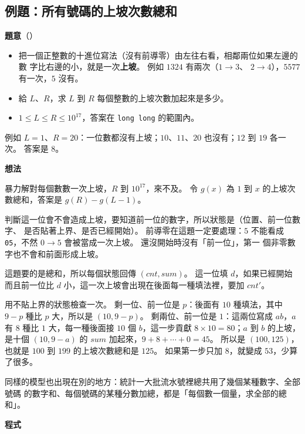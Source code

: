 \subsection{例題：所有號碼的上坡次數總和}
\label{sec:dg-ex-ascent}

\textbf{題意}（）

\begin{itemize}
\item 把一個正整數的十進位寫法（沒有前導零）由左往右看，相鄰兩位如果左邊的數
字比右邊的小，就是一次\textbf{上坡}。 例如 $1324$ 有兩次（$1 \to 3$、
$2 \to 4$），$5577$ 有一次，$5$ 沒有。
\item 給 $L$、$R$，求 $L$ 到 $R$ 每個整數的上坡次數加起來是多少。
\item $1 \le L \le R \le 10^{17}$，答案在 \texttt{long long} 的範圍內。
\end{itemize}

例如 $L = 1$、$R = 20$：一位數都沒有上坡；$10$、$11$、$20$ 也沒有；$12$ 到
$19$ 各一次。 答案是 $8$。

\textbf{想法}

暴力解對每個數數一次上坡，$R$ 到 $10^{17}$，來不及。 令 $g(x)$ 為 $1$ 到 $x$
的上坡次數總和，答案是 $g(R) - g(L - 1)$。

判斷這一位會不會造成上坡，要知道前一位的數字，所以狀態是（位置、前一位數字、
是否貼著上界、是否已經開始）。 前導零在這題一定要處理：$5$ 不能看成
\texttt{05}，不然 $0 \to 5$ 會被當成一次上坡。 還沒開始時沒有「前一位」，第一
個非零數字也不會和前面形成上坡。

這題要的是總和，所以每個狀態回傳 $(\mathit{cnt}, \mathit{sum})$。 這一位填
$d$，如果已經開始而且前一位比 $d$ 小，這一次上坡會出現在後面每一種填法裡，要加
$\mathit{cnt}'$。

用不貼上界的狀態檢查一次。 剩一位、前一位是 $p$：後面有 $10$ 種填法，其中
$9 - p$ 種比 $p$ 大，所以是 $(10, 9 - p)$。 剩兩位、前一位是 $1$：這兩位寫成
$ab$，$a$ 有 $8$ 種比 $1$ 大，每一種後面接 $10$ 個 $b$，這一步貢獻
$8 \times 10 = 80$；$a$ 到 $b$ 的上坡，是十個 $(10, 9 - a)$ 的 $\mathit{sum}$
加起來，$9 + 8 + \cdots + 0 = 45$。 所以是 $(100, 125)$，也就是 $100$ 到
$199$ 的上坡次數總和是 $125$。 如果第一步只加 $8$，就變成 $53$，少算了很多。

同樣的模型也出現在別的地方：統計一大批流水號裡總共用了幾個某種數字、全部號碼
的數字和、每個號碼的某種分數加總，都是「每個數一個量，求全部的總和」。

\textbf{程式}


